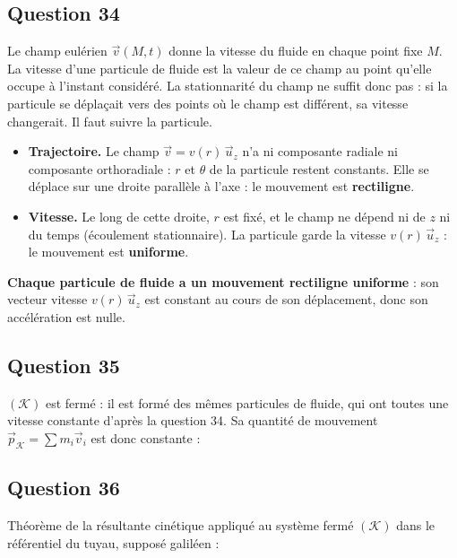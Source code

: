 \documentclass[11pt,a4paper]{article}
\providecommand{\tightlist}{\setlength{\itemsep}{0pt}\setlength{\parskip}{0pt}}
\newcommand{\equationajustee}[1]{%
  \sbox{\boiteequation}{$\displaystyle #1$}%
  \ifdim\wd\boiteequation>\linewidth
    \[\resizebox{\linewidth}{!}{\usebox{\boiteequation}}\]%
  \else
    \[#1\]%
  \fi}
\begin{document}
\hypertarget{question-34}{%
\subsection{Question 34}\label{question-34}}

Le champ eulérien \(\vec v(M,t)\) donne la vitesse du fluide en chaque point fixe \(M\). La vitesse d'une particule de fluide est la valeur de ce champ au point qu'elle occupe à l'instant considéré. La stationnarité du champ ne suffit donc pas : si la particule se déplaçait vers des points où le champ est différent, sa vitesse changerait. Il faut suivre la particule.

\begin{itemize}
\tightlist
\item
  \textbf{Trajectoire.} Le champ \(\vec v=v(r)\,\vec u_z\) n'a ni composante radiale ni composante orthoradiale : \(r\) et \(\theta\) de la particule restent constants. Elle se déplace sur une droite parallèle à l'axe : le mouvement est \textbf{rectiligne}.
\item
  \textbf{Vitesse.} Le long de cette droite, \(r\) est fixé, et le champ ne dépend ni de \(z\) ni du temps (écoulement stationnaire). La particule garde la vitesse \(v(r)\,\vec u_z\) : le mouvement est \textbf{uniforme}.
\end{itemize}

\textbf{Chaque particule de fluide a un mouvement rectiligne uniforme} : son vecteur vitesse \(v(r)\,\vec u_z\) est constant au cours de son déplacement, donc son accélération est nulle.

\hypertarget{question-35}{%
\subsection{Question 35}\label{question-35}}

\((\mathcal K)\) est fermé : il est formé des mêmes particules de fluide, qui ont toutes une vitesse constante d'après la question 34. Sa quantité de mouvement \(\vec p_{\mathcal K}=\sum m_i\vec v_i\) est donc constante :

\equationajustee{\boxed{\frac{\mathrm d\vec p_{\mathcal K}}{\mathrm dt}=\vec0}}

\hypertarget{question-36}{%
\subsection{Question 36}\label{question-36}}

Théorème de la résultante cinétique appliqué au système fermé \((\mathcal K)\) dans le référentiel du tuyau, supposé galiléen :
\end{document}
